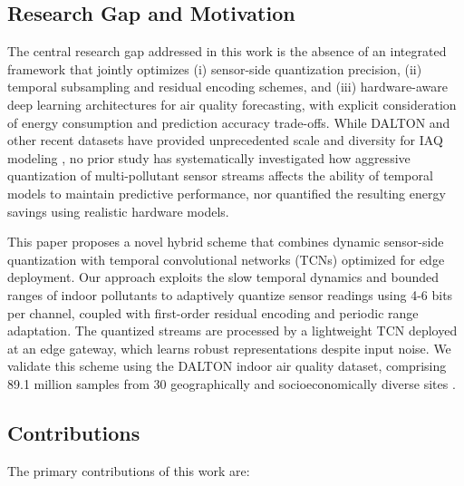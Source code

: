 \subsection{Research Gap and Motivation}

The central research gap addressed in this work is the absence of an integrated framework that jointly optimizes (i) sensor-side quantization precision, (ii) temporal subsampling and residual encoding schemes, and (iii) hardware-aware deep learning architectures for air quality forecasting, with explicit consideration of energy consumption and prediction accuracy trade-offs. While DALTON and other recent datasets have provided unprecedented scale and diversity for IAQ modeling \cite{karmakar2024indoor}, no prior study has systematically investigated how aggressive quantization of multi-pollutant sensor streams affects the ability of temporal models to maintain predictive performance, nor quantified the resulting energy savings using realistic hardware models.

This paper proposes a novel hybrid scheme that combines dynamic sensor-side quantization with temporal convolutional networks (TCNs) optimized for edge deployment. Our approach exploits the slow temporal dynamics and bounded ranges of indoor pollutants to adaptively quantize sensor readings using 4-6 bits per channel, coupled with first-order residual encoding and periodic range adaptation. The quantized streams are processed by a lightweight TCN deployed at an edge gateway, which learns robust representations despite input noise. We validate this scheme using the DALTON indoor air quality dataset, comprising 89.1 million samples from 30 geographically and socioeconomically diverse sites \cite{karmakar2024indoor}.

\subsection{Contributions}

The primary contributions of this work are:


